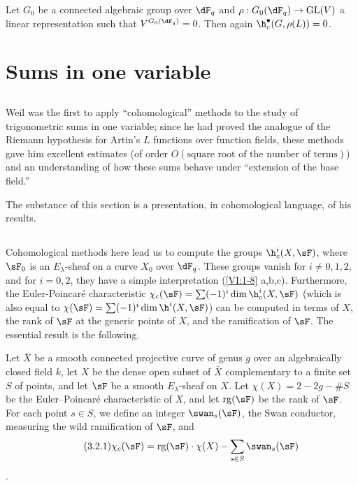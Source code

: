 \documentclass[oneside]{book}
\begin{document}
Let $G_0$ be a connected algebraic group over $\dF_q$ and 
$\rho:G_0(\dF_q) \to \operatorname{GL}(V)$ a linear representation 
such that $V^{G_0(\dF_q)}=0$. Then again $\h_c^\bullet(G,\rho(L))=0$. 










\section{Sums in one variable}\label{VI:3}





\subsection{}\label{VI:3-1}

Weil was the first to apply ``cohomological'' methods to 
the study of trigonometric sums in one variable; since he had 
proved the analogue of the Riemann hypothesis for Artin's $L$ functions 
over function fields, these methods gave him excellent 
estimates (of order $O(\text{square root of the number of terms})$) and an 
understanding of how these sums behave under ``extension of the base field.'' 

The substance of this section is a presentation, in cohomological language, of 
his results. 





\subsection{}\label{VI:3-2}

Cohomological methods here lead us to compute the groups 
$\h_c^i(X,\sF)$, where $\sF_0$ is an $E_\lambda$-sheaf on a curve $X_0$ over 
$\dF_q$. These groups vanish for $i\ne 0,1,2$, and for 
$i=0,2$, they have a simple interpretation (\ref{VI:1-8} a,b,c). Furthermore, the 
Euler-Poincaré characteristic 
$\chi_c(\sF) = \sum (-1)^i \dim \h_c^i(X,\sF)$ (which is also equal to 
$\chi(\sF) = \sum (-1)^i \dim \h^i(X,\sF)$) can be computed in terms of 
$X$, the rank of $\sF$ at the generic points of $X$, and the 
ramification of $\sF$. The essential result is the following. 

Let $\bar X$ be a smooth connected projective curve of genus $g$ over an 
algebraically closed field $k$, let $X$ be the dense open subset of $\bar X$ 
complementary to a finite set $S$ of points, and let $\sF$ be a 
smooth $E_\lambda$-sheaf on $X$. Let $\chi(X)=2-2 g-\# S$ be the 
Euler--Poincaré characteristic of $X$, and let $\operatorname{rg}(\sF)$ be the 
rank of $\sF$. For each point $s\in S$, we define an integer 
$\swan_s(\sF)$, the Swan conductor, measuring the wild ramification of 
$\sF$, and 
\begin{align*}\tag{3.2.1}\label{VI:eq:3-2-1}
  \chi_c(\sF) = \operatorname{rg}(\sF) \cdot \chi(X) - \sum_{s\in S} \swan_s(\sF) 
\end{align*}
\cite{ra65}. 
\end{document}
